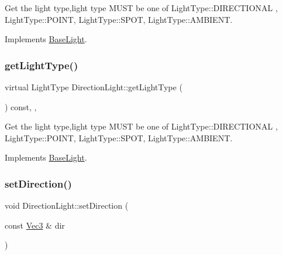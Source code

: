 Get the light type,light type M\+U\+ST be one of Light\+Type\+::\+D\+I\+R\+E\+C\+T\+I\+O\+N\+AL , Light\+Type\+::\+P\+O\+I\+NT, Light\+Type\+::\+S\+P\+OT, Light\+Type\+::\+A\+M\+B\+I\+E\+NT. 

Implements \hyperlink{classBaseLight_a620db25fed828de7328b83587f388030}{Base\+Light}.

\mbox{\label{classDirectionLight_a43c8fb8a7450d086430e0e2790a6a619}} 
\subsubsection{\texorpdfstring{get\+Light\+Type()}{getLightType()}\hspace{0.1cm}{\footnotesize\ttfamily [2/2]}}
{\footnotesize\ttfamily virtual Light\+Type Direction\+Light\+::get\+Light\+Type (\begin{DoxyParamCaption}{ }\end{DoxyParamCaption}) const\hspace{0.3cm}{\ttfamily [inline]}, {\ttfamily [override]}, {\ttfamily [virtual]}}

Get the light type,light type M\+U\+ST be one of Light\+Type\+::\+D\+I\+R\+E\+C\+T\+I\+O\+N\+AL , Light\+Type\+::\+P\+O\+I\+NT, Light\+Type\+::\+S\+P\+OT, Light\+Type\+::\+A\+M\+B\+I\+E\+NT. 

Implements \hyperlink{classBaseLight_a620db25fed828de7328b83587f388030}{Base\+Light}.

\mbox{\label{classDirectionLight_a2a14a017012b2d1b76a25852f7c16e0a}} 
\subsubsection{\texorpdfstring{set\+Direction()}{setDirection()}\hspace{0.1cm}{\footnotesize\ttfamily [1/2]}}
{\footnotesize\ttfamily void Direction\+Light\+::set\+Direction (\begin{DoxyParamCaption}\item[{const \hyperlink{classVec3}{Vec3} \&}]{dir }\end{DoxyParamCaption})}

